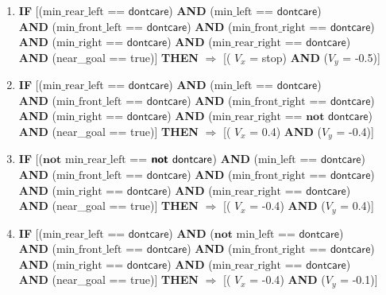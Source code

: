 \begin{enumerate}
	\item \textbf{IF} [($\text{min\_rear\_left}$ == $\textsf{dontcare}$) 
	\textbf{AND} ($\text{min\_left}$ == $\textsf{dontcare}$)\\
	\textbf{AND} ($\text{min\_front\_left}$ == $\textsf{dontcare}$)
	\textbf{AND} ($\text{min\_front\_right}$ == $\textsf{dontcare}$)\\
	\textbf{AND} ($\text{min\_right}$ == $\textsf{dontcare}$) 
	\textbf{AND} ($\text{min\_rear\_right}$ == $\textsf{dontcare}$) \\
	\textbf{AND} (near\_goal == \textsf{true})]
	\textbf{THEN} $\Rightarrow$ [( $V_x$ = \textsf{stop}) \textbf{AND} ($V_y$ = \textsf{-0.5})]
	
	\newpage
	
	\item \textbf{IF} [($\text{min\_rear\_left}$ == $\textsf{dontcare}$) 
	\textbf{AND} ($\text{min\_left}$ == $\textsf{dontcare}$)\\
	\textbf{AND} ($\text{min\_front\_left}$ == $\textsf{dontcare}$)
	\textbf{AND} ($\text{min\_front\_right}$ == $\textsf{dontcare}$)\\
	\textbf{AND} ($\text{min\_right}$ == $\textsf{dontcare}$) 
	\textbf{AND} ($\text{min\_rear\_right}$ == $\textbf{not } \textsf{dontcare}$)\\
	\textbf{AND} (near\_goal == \textsf{true})]
	\textbf{THEN} $\Rightarrow$ [( $V_x$ = \textsf{0.4}) \textbf{AND} ($V_y$ = \textsf{-0.4})]
	
	\item \textbf{IF} [($\textbf{not }\text{min\_rear\_left}$ == $\textsf{\textbf{not }dontcare}$) 
	\textbf{AND} ($\text{min\_left}$ == $\textsf{dontcare}$)\\
	\textbf{AND} ($\text{min\_front\_left}$ == $\textsf{dontcare}$)
	\textbf{AND} ($\text{min\_front\_right}$ == $\textsf{dontcare}$)\\
	\textbf{AND} ($\text{min\_right}$ == $\textsf{dontcare}$) 
	\textbf{AND} ($\text{min\_rear\_right}$ == $\textsf{dontcare}$)\\
	\textbf{AND} (near\_goal == \textsf{true})]
	\textbf{THEN} $\Rightarrow$ [( $V_x$ = \textsf{-0.4}) \textbf{AND} ($V_y$ = \textsf{0.4})]
	
	\item \textbf{IF} [($\text{min\_rear\_left}$ == $\textsf{dontcare}$) 
	\textbf{AND} ($\textbf{not }\text{min\_left}$ == $\textsf{dontcare}$)\\
	\textbf{AND} ($\text{min\_front\_left}$ == $\textsf{dontcare}$)
	\textbf{AND} ($\text{min\_front\_right}$ == $\textsf{dontcare}$)\\
	\textbf{AND} ($\text{min\_right}$ == $\textsf{dontcare}$) 
	\textbf{AND} ($\text{min\_rear\_right}$ == $\textsf{dontcare}$)\\
	\textbf{AND} (near\_goal == \textsf{true})]
	\textbf{THEN} $\Rightarrow$ [( $V_x$ = \textsf{-0.4}) \textbf{AND} ($V_y$ = \textsf{-0.1})]
	

\end{enumerate}
